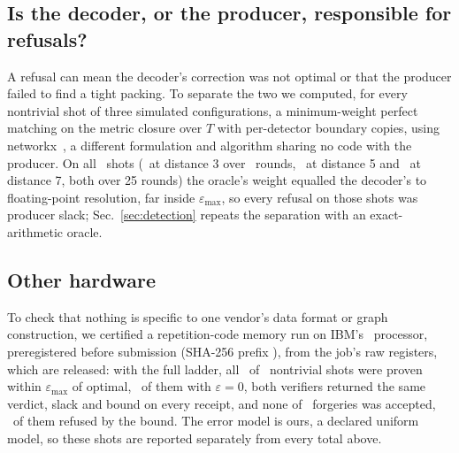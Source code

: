 \documentclass[aps,pra,twocolumn,superscriptaddress,nofootinbib,longbibliography,floatfix]{revtex4-2}
\newcommand{\eps}{\varepsilon}
\newcommand{\T}{T}
\begin{document}
\begin{table}[!tbp]
\caption{The held-out distance-7 sample as its preregistered stopping rule left it, per arm and pooled over the two bases: chunks completed of 40 planned, nontrivial shots $N$, proven within $\eps_{\max}$, not proven, the preregistered computation of the exact one-sided 95\% Clopper--Pearson bound on the not-proven rate (prereg.\ CP, \%), which carries no coverage guarantee for a sample selected by completion (Sec.~\ref{sec:results}), the longest run of completed chunks from the first (prefix), and the nontrivial shots of the chunks still being computed at the stop (unfinished), which the worst case counts as not proven. Rounds are named with every rate.}
\label{tab:heldout-d7}
\centering\small

\end{table}

\subsection{Is the decoder, or the producer, responsible for refusals?}
\label{sec:oracle}

A refusal can mean the decoder's correction was not optimal or that the producer failed to find a tight packing. To separate the two we computed, for every nontrivial shot of three simulated configurations, a minimum-weight perfect matching on the metric closure over $\T$ with per-detector boundary copies, using networkx~\cite{hagberg2008networkx}, a different formulation and algorithm sharing no code with the producer. On all \OracleShots\ shots (\OracleShotsThree\ at distance 3 over \OracleRoundsThree\ rounds, \OracleShotsFive\ at distance 5 and \OracleShotsSeven\ at distance 7, both over 25 rounds) the oracle's weight equalled the decoder's to floating-point resolution, far inside $\eps_{\max}$, so every refusal on those shots was producer slack; Sec.~\ref{sec:detection} repeats the separation with an exact-arithmetic oracle.

\subsection{Other hardware}
\label{sec:other-hw}

To check that nothing is specific to one vendor's data format or graph construction, we certified a repetition-code memory run on IBM's \IbmBackend\ processor, preregistered before submission (SHA-256 prefix \texttt{\IbmPreregPrefix}), from the job's raw registers, which are released: with the full ladder, all \IbmEpsAccepted\ of \IbmNontrivial\ nontrivial shots were proven within $\eps_{\max}$ of optimal, \IbmEpsExact\ of them with $\eps=0$, both verifiers returned the same verdict, slack and bound on every receipt, and none of \IbmEpsForgeries\ forgeries was accepted, \IbmEpsForgeriesBound\ of them refused by the bound. The error model is ours, a declared uniform model, so these shots are reported separately from every total above.
\end{document}
